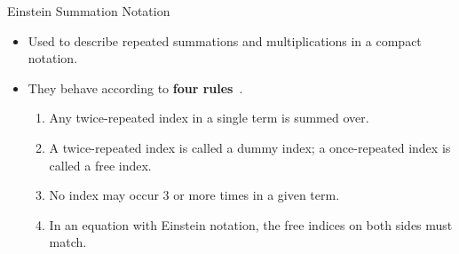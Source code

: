 \documentclass[aspectratio=169,xcolor=dvipsnames]{beamer}
\begin{document}
\begin{frame}{Einstein Summation Notation}
    \begin{itemize}
      \item Used to describe repeated summations and multiplications in a compact notation.
      \item They behave according to \textbf{four rules}~\cite{Khan2023}.
            \begin{enumerate}
            \item Any twice-repeated index in a single term is summed over.
            \item A twice-repeated index is called a dummy index; a once-repeated 
                  index is called a free index.
            \item No index may occur 3 or more times in a given term.
            \item In an equation with Einstein notation, the free indices on both sides must
                  match.
            \end{enumerate}
    \end{itemize}
\end{frame}
\end{document}
